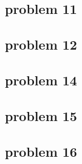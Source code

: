 \subsection{problem 11}


\subsection{problem 12}


\subsection{problem 14}


\subsection{problem 15}


\subsection{problem 16}

